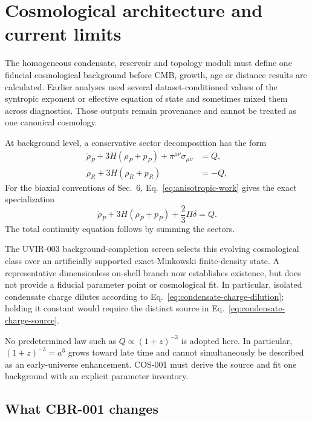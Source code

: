 \section{Cosmological architecture and current limits}

The homogeneous condensate, reservoir and topology moduli must define one
fiducial cosmological background before CMB, growth, age or distance results
are calculated.  Earlier analyses used several dataset-conditioned values of
the syntropic exponent or effective equation of state and sometimes mixed
them across diagnostics.  Those outputs remain provenance and cannot be
treated as one canonical cosmology.

At background level, a conservative sector decomposition has the
form
\begin{align}
 \dot\rho_P+3H(\rho_P+p_P)+\pi^{\mu\nu}\sigma_{\mu\nu} &= Q,\\
 \dot\rho_R+3H(\rho_R+p_R) &= -Q,
 \label{eq:background-exchange}
\end{align}
For the biaxial conventions of Sec.~6,
Eq.~\eqref{eq:anisotropic-work} gives the exact specialization
\begin{equation}
 \dot\rho_P+3H(\rho_P+p_P)+\frac{2}{3}\Pi\delta=Q.
 \label{eq:biaxial-plenum-continuity}
\end{equation}
The total continuity equation follows by summing the sectors.

The UVIR-003 background-completion screen selects this evolving cosmological
class over an artificially supported exact-Minkowski finite-density state.
A representative dimensionless on-shell branch now establishes existence,
but does not provide a fiducial parameter point or cosmological fit.  In
particular, isolated
condensate charge dilutes according to Eq.~\eqref{eq:condensate-charge-dilution};
holding it constant would require the distinct source in
Eq.~\eqref{eq:condensate-charge-source}.

No predetermined law such as $Q\propto(1+z)^{-3}$ is adopted here.  In
particular, $(1+z)^{-3}=a^3$ grows toward late time and cannot simultaneously
be described as an early-universe enhancement.  COS-001 must derive the source
and fit one background with an explicit parameter inventory.

\subsection{What CBR-001 changes}

